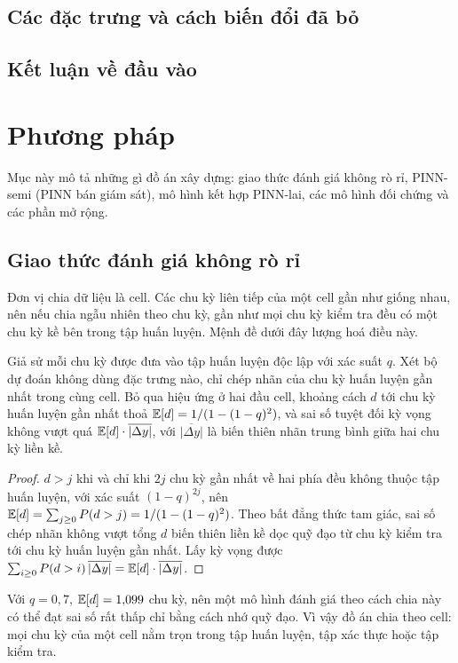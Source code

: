 

\subsection{Các đặc trưng và cách biến đổi đã bỏ}\label{sec:dt_bo}



\subsection{Kết luận về đầu vào}\label{sec:dt_ketluan}




\section{Phương pháp}\label{ch:thuchien}

Mục này mô tả những gì đồ án xây dựng: giao thức đánh giá không rò rỉ, PINN-semi (PINN bán giám sát), mô hình kết hợp
PINN-lai, các mô hình đối chứng và các phần mở rộng.

\subsection{Giao thức đánh giá không rò rỉ}\label{sec:protocol}

Đơn vị chia dữ liệu là cell. Các chu kỳ liên tiếp của một cell gần như giống nhau, nên nếu chia ngẫu nhiên theo chu kỳ,
gần như mọi chu kỳ kiểm tra đều có một chu kỳ kề bên trong tập huấn luyện. Mệnh đề dưới đây lượng hoá điều này.

\begin{menhde}\label{md:rowleak}
Giả sử mỗi chu kỳ được đưa vào tập huấn luyện độc lập với xác suất $q$. Xét bộ dự đoán không dùng đặc trưng nào, chỉ chép
nhãn của chu kỳ huấn luyện gần nhất trong cùng cell. Bỏ qua hiệu ứng ở hai đầu cell, khoảng cách $d$ tới chu kỳ huấn
luyện gần nhất thoả $\mathbb{E}[d] = 1/(1 - (1-q)^2)$, và sai số tuyệt đối kỳ vọng không vượt quá $\mathbb{E}[d]\cdot\overline{|\Delta
y|}$, với $\overline{|\Delta y|}$ là biến thiên nhãn trung bình giữa hai chu kỳ liền kề.
\end{menhde}
\begin{proof}
$d > j$ khi và chỉ khi $2j$ chu kỳ gần nhất về hai phía đều không thuộc tập huấn luyện, với xác suất $(1-q)^{2j}$, nên
$\mathbb{E}[d] = \sum_{j \ge 0} P(d > j) = 1/(1-(1-q)^2)$. Theo bất đẳng thức tam giác, sai số chép nhãn không vượt tổng $d$
biến thiên liền kề dọc quỹ đạo từ chu kỳ kiểm tra tới chu kỳ huấn luyện gần nhất. Lấy kỳ vọng được
$\sum_{i \ge 0} P(d > i)\,\overline{|\Delta y|} = \mathbb{E}[d]\cdot\overline{|\Delta y|}$.
\end{proof}
Với $q = 0{,}7$, $\mathbb{E}[d] = 1{,}099$ chu kỳ, nên một mô hình đánh giá theo cách chia này có thể đạt sai số rất thấp chỉ bằng
cách nhớ quỹ đạo. Vì vậy đồ án chia theo cell: mọi chu kỳ của một cell nằm trọn trong tập huấn luyện, tập xác thực hoặc
tập kiểm tra.

